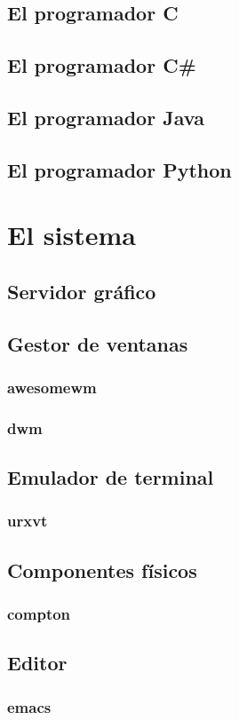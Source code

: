 \documentclass[a4paper, 11pt, titlepage]{book}
\begin{document}
    \section{El programador C}

    \section{El programador C\#}

    \section{El programador Java}

    \section{El programador Python}

\chapter{El sistema}

    \section{Servidor gráfico}

    \section{Gestor de ventanas}

        \subsection{awesomewm}

        \subsection{dwm}

    \section{Emulador de terminal}

        \subsection{urxvt}

    \section{Componentes físicos}

        \subsection{compton}

    \section{Editor}

        \subsection{emacs}
\end{document}
